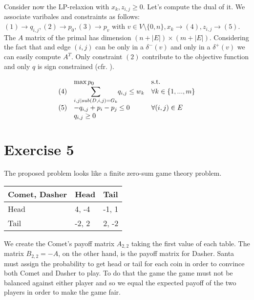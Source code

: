 \documentclass[paper=a4, fontsize=11pt]{scrartcl} %
\numberwithin{equation}{section} %
\numberwithin{figure}{section} %
\numberwithin{table}{section} %
\begin{document}
Consider now the LP-relaxion with $x_k, z_{i,j} \geq 0$. Let's compute the dual of it.
We associate varibales and constraints as follows: $(1) \rightarrow q_{i,j}, (2) \rightarrow p_0, (3) \rightarrow p_v \text{ with } v \in V \setminus \{0,n\}, x_k \rightarrow (4), z_{i,j} \rightarrow (5)$.
The $A$ matrix of the primal has dimension $(n+|E|)\times(m+|E|)$. Considering the fact that and edge $(i,j)$ can be only in a $\delta^-(v)$ and only in a $\delta^+(v)$ we can easily compute $A^T$.
Only constraint $(2)$ contribute to the objective function and only $q$ is sign constrained (cfr. \cite{cap8roma}).

\[
    \begin{array}{lll}
    & \max p_0 & \text{s.t.} \\
    (4) & \mathlarger{\sum}_{i,j | sub(D,i,j)=G_k} q_{i,j} \leq w_k & \forall k \in \{1,...,m\}\\
    (5) & -q_{i,j} +p_i -p_j \leq 0 & \forall (i,j) \in E\\
    & q_{i,j} \geq 0 & \\
    \end{array}
\]

\newpage
\section{Exercise 5}

The proposed problem looks like a finite zero-sum game theory problem.

\begin{center}
    \begin{tabular}{ | l | l | l | }
        \hline
        Comet, Dasher & Head & Tail \\ \hline
        Head & 4, -4 & -1, 1 \\ \hline
        Tail & -2, 2 & 2, -2 \\ \hline
    \end{tabular}
\end{center}

We create the Comet's payoff matrix $A_{2,2}$ taking the first value of each table. The matrix $B_{2,2} = -A$, on the other hand, is the payoff matrix for Dasher.
Santa must assign the probability to get head or tail for each coin in order to convince both Comet and Dasher to play.
To do that the game the game must not be balanced against either player and so we equal the expected payoff of the two players in order to make the game fair.
\end{document}
